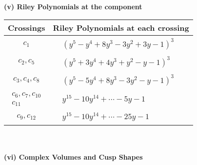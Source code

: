 \documentclass[1p]{elsarticle_modified}
\theoremstyle{definition}
\begin{document}
\newpage\renewcommand{\arraystretch}{1}
\flushleft \textbf{(v) Riley Polynomials at the component}\newline \\
\begin{tabular}{m{50pt}|m{274pt}}
Crossings & \hspace{64pt}Riley Polynomials at each crossing \\
\hline $$\begin{aligned}c_{1}\end{aligned}$$&$\begin{aligned}
&(y^5- y^4+8 y^3-3 y^2+3 y-1)^3
\end{aligned}$\\
\hline $$\begin{aligned}c_{2},c_{5}\end{aligned}$$&$\begin{aligned}
&(y^5+3 y^4+4 y^3+y^2- y-1)^3
\end{aligned}$\\
\hline $$\begin{aligned}c_{3},c_{4},c_{8}\end{aligned}$$&$\begin{aligned}
&(y^5-5 y^4+8 y^3-3 y^2- y-1)^3
\end{aligned}$\\
\hline $$\begin{aligned}c_{6},c_{7},c_{10}\\c_{11}\end{aligned}$$&$\begin{aligned}
&y^{15}-10 y^{14}+\cdots-5 y-1
\end{aligned}$\\
\hline $$\begin{aligned}c_{9},c_{12}\end{aligned}$$&$\begin{aligned}
&y^{15}-10 y^{14}+\cdots-25 y-1
\end{aligned}$\\
\hline
\end{tabular}\\~\\
\newpage\flushleft \textbf{(vi) Complex Volumes and Cusp Shapes}
\end{document}
